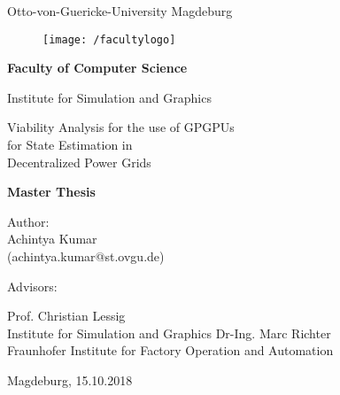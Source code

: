 \documentclass[thesis.tex]{subfiles}
\begin{document}
\thispagestyle {empty}

\begin{center}
\begin{Large}
Otto-von-Guericke-University Magdeburg\\

\begin{figure}
	\centering
	\texttt{[image: /facultylogo]}
	\label{fig:logoinffak}
\end{figure}

\vspace{3mm}

\textbf{Faculty of Computer Science}\\
\end{Large}

\vspace{3mm}

Institute for Simulation and Graphics\\

\vspace{1cm}
\begin{Huge}
Viability Analysis for the use of GPGPUs 
\\for State Estimation in \\Decentralized Power Grids\\
\end{Huge}
\vspace{15mm}
{\Huge \textbf{Master Thesis}}\\
\vspace{15mm}

Author:\\
\vspace{4mm}
{\huge Achintya Kumar}\\
\vspace{2mm}
(achintya.kumar@st.ovgu.de)

\vspace{20mm}
Advisors:
\vspace{2mm}

{\large Prof. Christian Lessig}\\
Institute for Simulation and Graphics\linebreak
\linebreak
{\large Dr-Ing. Marc Richter}\\
Fraunhofer Institute for Factory Operation and Automation

\vspace{25mm}

{\large Magdeburg, 15.10.2018}\\

\vspace{40mm}

\end{center}
\clearpage
\end{document}
